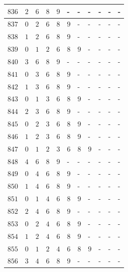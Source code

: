 \begin{appendices}
\begin{table}[H]
\begin{tabular} {|l|l|l|l|l|l|l|l|l|l|l|}
  		$ 836 $ & $ 2 $ &$ 6 $ &$ 8 $ &$ 9 $ & - &  - &  - &  - &  - &  -   \\ \hline
  		$ 837 $ & $ 0 $ &$ 2 $ &$ 6 $ &$ 8 $ &$ 9 $ & - &  - &  - &  - &  -   \\ \hline
  		$ 838 $ & $ 1 $ &$ 2 $ &$ 6 $ &$ 8 $ &$ 9 $ & - &  - &  - &  - &  -   \\ \hline
  		$ 839 $ & $ 0 $ &$ 1 $ &$ 2 $ &$ 6 $ &$ 8 $ &$ 9 $ & - &  - &  - &  -   \\ \hline
  		$ 840 $ & $ 3 $ &$ 6 $ &$ 8 $ &$ 9 $ & - &  - &  - &  - &  - &  -   \\ \hline
  		$ 841 $ & $ 0 $ &$ 3 $ &$ 6 $ &$ 8 $ &$ 9 $ & - &  - &  - &  - &  -   \\ \hline
  		$ 842 $ & $ 1 $ &$ 3 $ &$ 6 $ &$ 8 $ &$ 9 $ & - &  - &  - &  - &  -   \\ \hline
  		$ 843 $ & $ 0 $ &$ 1 $ &$ 3 $ &$ 6 $ &$ 8 $ &$ 9 $ & - &  - &  - &  -   \\ \hline
  		$ 844 $ & $ 2 $ &$ 3 $ &$ 6 $ &$ 8 $ &$ 9 $ & - &  - &  - &  - &  -   \\ \hline
  		$ 845 $ & $ 0 $ &$ 2 $ &$ 3 $ &$ 6 $ &$ 8 $ &$ 9 $ & - &  - &  - &  -   \\ \hline
  		$ 846 $ & $ 1 $ &$ 2 $ &$ 3 $ &$ 6 $ &$ 8 $ &$ 9 $ & - &  - &  - &  -   \\ \hline
  		$ 847 $ & $ 0 $ &$ 1 $ &$ 2 $ &$ 3 $ &$ 6 $ &$ 8 $ &$ 9 $ & - &  - &  -   \\ \hline
  		$ 848 $ & $ 4 $ &$ 6 $ &$ 8 $ &$ 9 $ & - &  - &  - &  - &  - &  -   \\ \hline
  		$ 849 $ & $ 0 $ &$ 4 $ &$ 6 $ &$ 8 $ &$ 9 $ & - &  - &  - &  - &  -   \\ \hline
  		$ 850 $ & $ 1 $ &$ 4 $ &$ 6 $ &$ 8 $ &$ 9 $ & - &  - &  - &  - &  -   \\ \hline
  		$ 851 $ & $ 0 $ &$ 1 $ &$ 4 $ &$ 6 $ &$ 8 $ &$ 9 $ & - &  - &  - &  -   \\ \hline
  		$ 852 $ & $ 2 $ &$ 4 $ &$ 6 $ &$ 8 $ &$ 9 $ & - &  - &  - &  - &  -   \\ \hline
  		$ 853 $ & $ 0 $ &$ 2 $ &$ 4 $ &$ 6 $ &$ 8 $ &$ 9 $ & - &  - &  - &  -   \\ \hline
  		$ 854 $ & $ 1 $ &$ 2 $ &$ 4 $ &$ 6 $ &$ 8 $ &$ 9 $ & - &  - &  - &  -   \\ \hline
  		$ 855 $ & $ 0 $ &$ 1 $ &$ 2 $ &$ 4 $ &$ 6 $ &$ 8 $ &$ 9 $ & - &  - &  -   \\ \hline
  		$ 856 $ & $ 3 $ &$ 4 $ &$ 6 $ &$ 8 $ &$ 9 $ & - &  - &  - &  - &  -   \\ \hline

\end{tabular}
\end{table}
\end{appendices}
